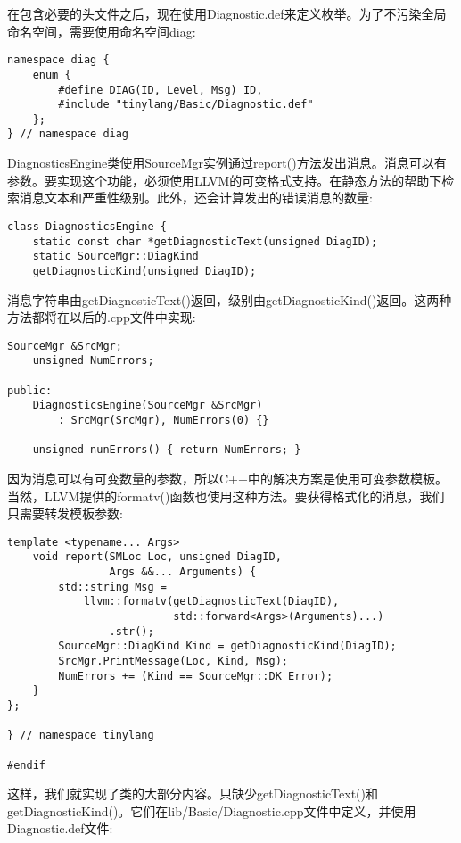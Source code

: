 在包含必要的头文件之后，现在使用Diagnostic.def来定义枚举。为了不污染全局命名空间，需要使用命名空间diag:\par

\begin{lstlisting}[caption={}]
namespace diag {
	enum {
		#define DIAG(ID, Level, Msg) ID,
		#include "tinylang/Basic/Diagnostic.def"
	};
} // namespace diag
\end{lstlisting}

DiagnosticsEngine类使用SourceMgr实例通过report()方法发出消息。消息可以有参数。要实现这个功能，必须使用LLVM的可变格式支持。在静态方法的帮助下检索消息文本和严重性级别。此外，还会计算发出的错误消息的数量:\par

\begin{lstlisting}[caption={}]
class DiagnosticsEngine {
	static const char *getDiagnosticText(unsigned DiagID);
	static SourceMgr::DiagKind
	getDiagnosticKind(unsigned DiagID);
\end{lstlisting}

消息字符串由getDiagnosticText()返回，级别由getDiagnosticKind()返回。这两种方法都将在以后的.cpp文件中实现:\par

\begin{lstlisting}[caption={}]
	SourceMgr &SrcMgr;
	unsigned NumErrors;
	
public:
	DiagnosticsEngine(SourceMgr &SrcMgr)
		: SrcMgr(SrcMgr), NumErrors(0) {}
		
	unsigned nunErrors() { return NumErrors; }
\end{lstlisting}

因为消息可以有可变数量的参数，所以C++中的解决方案是使用可变参数模板。当然，LLVM提供的formatv()函数也使用这种方法。要获得格式化的消息，我们只需要转发模板参数:\par

\begin{lstlisting}[caption={}]
	template <typename... Args>
	void report(SMLoc Loc, unsigned DiagID,
				Args &&... Arguments) {
		std::string Msg =
			llvm::formatv(getDiagnosticText(DiagID),
						  std::forward<Args>(Arguments)...)
				.str();
		SourceMgr::DiagKind Kind = getDiagnosticKind(DiagID);
		SrcMgr.PrintMessage(Loc, Kind, Msg);
		NumErrors += (Kind == SourceMgr::DK_Error);
	}
};

} // namespace tinylang

#endif
\end{lstlisting}

这样，我们就实现了类的大部分内容。只缺少getDiagnosticText()和getDiagnosticKind()。它们在lib/Basic/Diagnostic.cpp文件中定义，并使用Diagnostic.def文件:\par

